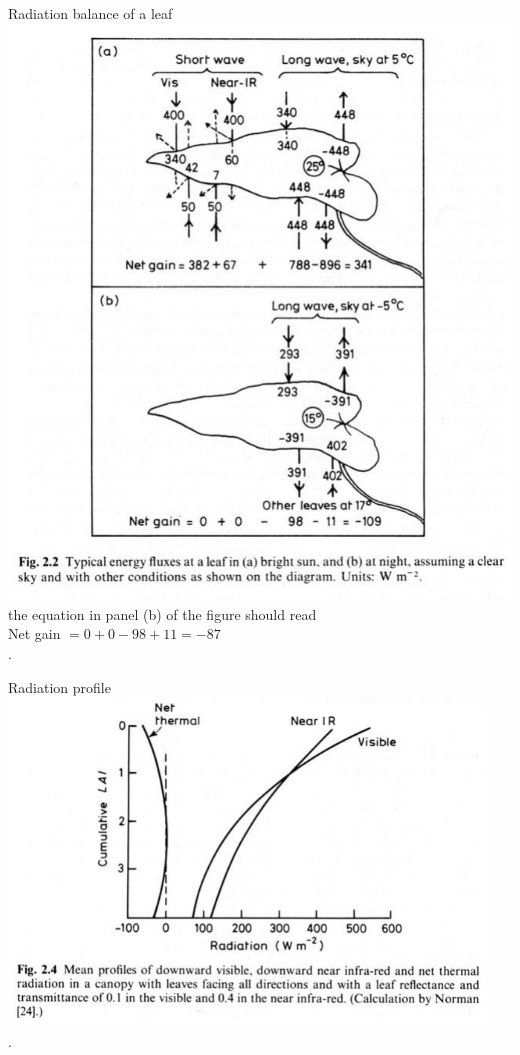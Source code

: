 \documentclass[10pt]{beamer}
\begin{document}
\begin{frame}{Radiation balance of a leaf}
    \centering\includegraphics[height=0.75\textheight]{figures/Grace2.2EnergyLeaf}\\
    {\footnotesize the equation in panel (b) of the figure should read\\
    Net gain $=0+0-98+11=-87$}\\
     {\small \autocite[from][]{Grace1983}.}
\end{frame}

\begin{frame}{Radiation profile}
    \centering\includegraphics[width=0.95\textwidth]{figures/Grace2.4RadiationProfileCanopy}\\
    {\small \autocite[from][]{Grace1983}.}
\end{frame}
\end{document}
